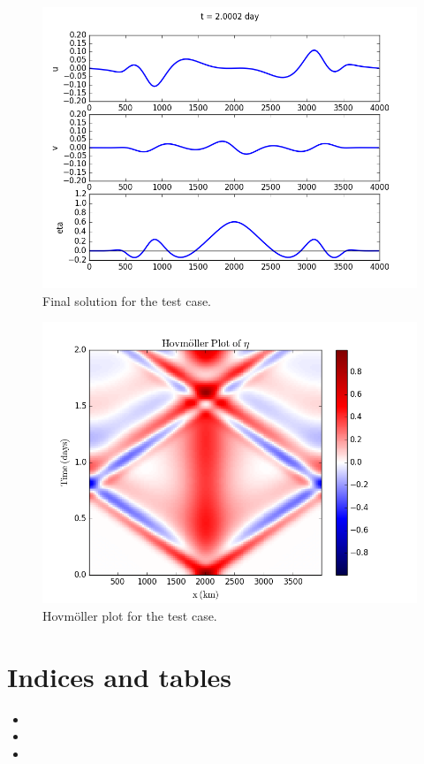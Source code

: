 \documentclass[letterpaper,10pt,english]{sphinxmanual}
\begin{document}
\begin{figure}[htbp]
\centering
\capstart

\includegraphics{Figures/ex1_fig1.png}
\caption{Final solution for the test case.}\end{figure}
\begin{figure}[htbp]
\centering
\capstart

\includegraphics{Figures/ex1_fig2.png}
\caption{Hovmöller plot for the test case.}\end{figure}


\chapter{Indices and tables}
\label{index:indices-and-tables}\begin{itemize}
\item {} 

\item {} 

\item {} 

\end{itemize}



\renewcommand{\indexname}{Index}
\printindex
\end{document}
